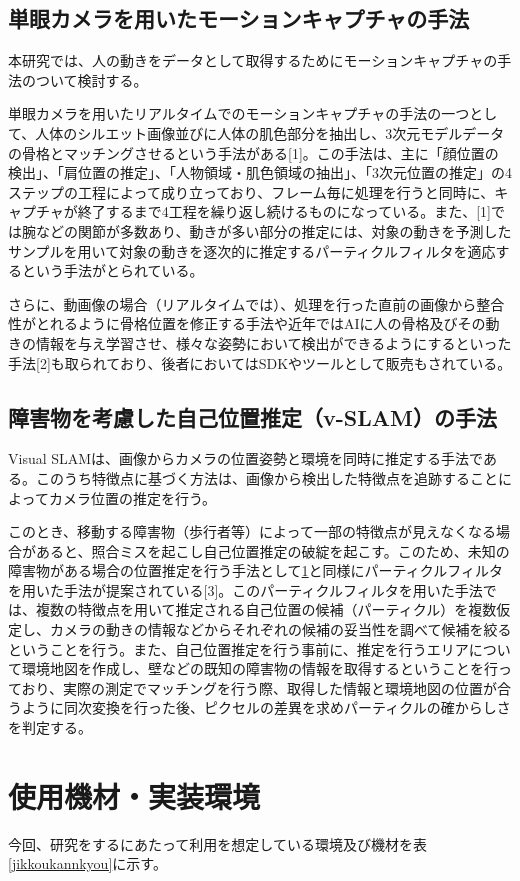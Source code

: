 \documentclass[11pt]{jreport}
\begin{document}
\section{単眼カメラを用いたモーションキャプチャの手法}\label{rep1}
本研究では、人の動きをデータとして取得するためにモーションキャプチャの手法のついて検討する。

単眼カメラを用いたリアルタイムでのモーションキャプチャの手法の一つとして、人体のシルエット画像並びに人体の肌色部分を抽出し、3次元モデルデータの骨格とマッチングさせるという手法がある[1]。この手法は、主に「顔位置の検出」、「肩位置の推定」、「人物領域・肌色領域の抽出」、「3次元位置の推定」の4ステップの工程によって成り立っており、フレーム毎に処理を行うと同時に、キャプチャが終了するまで4工程を繰り返し続けるものになっている。また、[1]では腕などの関節が多数あり、動きが多い部分の推定には、対象の動きを予測したサンプルを用いて対象の動きを逐次的に推定するパーティクルフィルタを適応するという手法がとられている。

さらに、動画像の場合（リアルタイムでは）、処理を行った直前の画像から整合性がとれるように骨格位置を修正する手法や近年ではAIに人の骨格及びその動きの情報を与え学習させ、様々な姿勢において検出ができるようにするといった手法[2]も取られており、後者においてはSDKやツールとして販売もされている。

\section{障害物を考慮した自己位置推定（v-SLAM）の手法}
Visual SLAMは、画像からカメラの位置姿勢と環境を同時に推定する手法である。このうち特徴点に基づく方法は、画像から検出した特徴点を追跡することによってカメラ位置の推定を行う。

このとき、移動する障害物（歩行者等）によって一部の特徴点が見えなくなる場合があると、照合ミスを起こし自己位置推定の破綻を起こす。このため、未知の障害物がある場合の位置推定を行う手法として\ref{rep1}と同様にパーティクルフィルタを用いた手法が提案されている[3]。このパーティクルフィルタを用いた手法では、複数の特徴点を用いて推定される自己位置の候補（パーティクル）を複数仮定し、カメラの動きの情報などからそれぞれの候補の妥当性を調べて候補を絞るということを行う。また、自己位置推定を行う事前に、推定を行うエリアについて環境地図を作成し、壁などの既知の障害物の情報を取得するということを行っており、実際の測定でマッチングを行う際、取得した情報と環境地図の位置が合うように同次変換を行った後、ピクセルの差異を求めパーティクルの確からしさを判定する。

\chapter{使用機材・実装環境}
今回、研究をするにあたって利用を想定している環境及び機材を表\ref{jikkoukannkyou}に示す。
\end{document}
